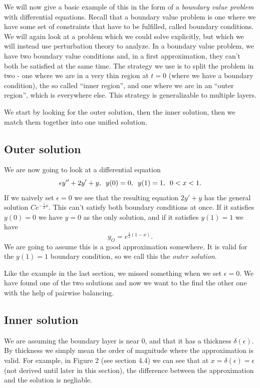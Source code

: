 \documentclass[12pt]{article}
\begin{document}
We will now give a basic example of this in the form of a
\textit{boundary value problem} with differential equations. Recall
that a boundary value problem is one where we have some set of
constraints that have to be fulfilled, called boundary conditions. We
will again look at a problem which we could solve explicitly, but
which we will instead use perturbation theory to analyze. In a
boundary value problem, we have two boundary value conditions and, in
a first approximation, they can't both be satisfied at the same
time. The strategy we use is to split the problem in two - one where
we are in a very thin region at $t=0$ (where we have a boundary
condition), the so called ``inner region'', and one where we are in an
``outer region'', which is everywhere else. This strategy is
generalizable to multiple layers.

We start by looking for the outer solution, then the inner solution,
then we match them together into one unified solution.

\subsection{Outer solution}

We are now going to look at a differential equation
\begin{equation}
\epsilon y'' + 2 y' + y, \enskip y(0)=0, \enskip y(1)=1, \enskip 0 < x < 1.
\end{equation}
If we naively set $\epsilon = 0$ we see that the resulting equation $2 y' + y$
has the general solution $C e^{- \frac{1}{2}x}$. This can't satisfy both
boundary conditions at once. If it satisfies $y(0)=0$ we have $y=0$ as the only
solution, and if it satisfies $y(1)=1$ we have
\begin{equation}
y_O=e^{\frac{1}{2} (1 - x)}.
\end{equation}
We are going to assume this is a good approximation somewhere. It is
valid for the $y(1)=1$ boundary condition, so we call this the
\textit{outer solution}.

Like the example in the last section, we missed something when we set $\epsilon
= 0$. We have found one of the two solutions and now we want to the find the
other one with the help of pairwise balancing.

\subsection{Inner solution}

We are assuming the boundary layer is near 0, and that it has a
thickness $\delta(\epsilon)$. By thickness we simply mean the order of
magnitude where the approximation is valid. For example, in Figure 2
(see section 4.4) we can see that at $x=\delta(\epsilon)=\epsilon$
(not derived until later in this section), the difference between the
approximation and the solution is negliable.
\end{document}
